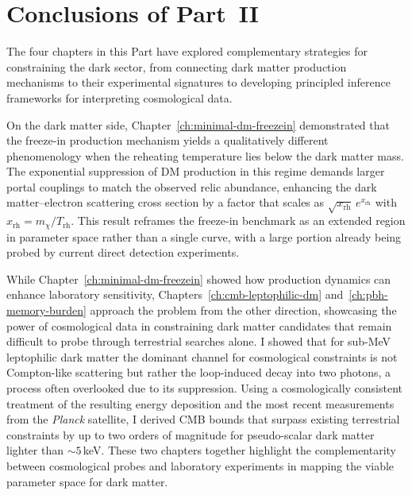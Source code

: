 \chapter*{Conclusions of Part~II}
\label{ch:part2-concl}

The four chapters in this Part have explored complementary strategies for constraining the dark sector, from connecting dark matter production mechanisms to their experimental signatures to developing principled inference frameworks for interpreting cosmological data.

On the dark matter side, Chapter~\ref{ch:minimal-dm-freezein} demonstrated that the freeze-in production mechanism yields a qualitatively different phenomenology when the reheating temperature lies below the dark matter mass. The exponential suppression of DM production in this regime demands larger portal couplings to match the observed relic abundance, enhancing the dark matter--electron scattering cross section by a factor that scales as $\sqrt{x_\mathrm{rh}}\,e^{x_\mathrm{rh}}$ with $x_\mathrm{rh} = m_\chi/T_\mathrm{rh}$. This result reframes the freeze-in benchmark as an extended region in parameter space rather than a single curve, with a large portion already being probed by current direct detection experiments. 

While Chapter~\ref{ch:minimal-dm-freezein} showed how production dynamics can enhance laboratory sensitivity, Chapters~\ref{ch:cmb-leptophilic-dm} and~\ref{ch:pbh-memory-burden} approach the problem from the other direction, showcasing the power of cosmological data in constraining dark matter candidates that remain difficult to probe through terrestrial searches alone. 
I showed that for sub-MeV leptophilic dark matter the dominant channel for cosmological constraints is not Compton-like scattering but rather the loop-induced decay into two photons, a process often overlooked due to its suppression. Using a cosmologically consistent treatment of the resulting energy deposition and the most recent measurements from the \textit{Planck} satellite, I derived CMB bounds that surpass existing terrestrial constraints by up to two orders of magnitude for pseudo-scalar dark matter lighter than $\sim 5\,$keV. These two chapters together highlight the complementarity between cosmological probes and laboratory experiments in mapping the viable parameter space for dark matter.

